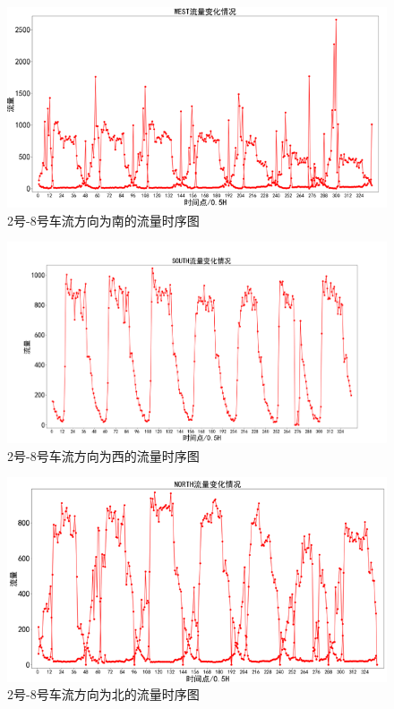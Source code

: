 \documentclass[UTF8]{article}
\begin{document}
        \begin{figure}[H]
            \includegraphics[width=\linewidth]{6.png}
            \caption{2号-8号车流方向为南的流量时序图}
        \end{figure}
        \begin{figure}[H]
            \includegraphics[width=\linewidth]{7.png}
            \caption{2号-8号车流方向为西的流量时序图}
        \end{figure}
        \begin{figure}[H]
            \includegraphics[width=\linewidth]{8.png}
            \caption{2号-8号车流方向为北的流量时序图}
        \end{figure}
\end{document}
